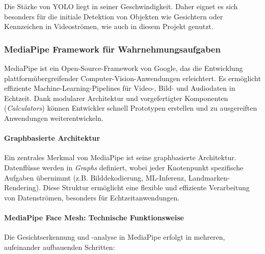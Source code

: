 Die Stärke von YOLO liegt in seiner Geschwindigkeit. Daher eignet es sich besonders für die initiale Detektion von Objekten wie Gesichtern oder Kennzeichen in Videoströmen, wie auch in diesem Projekt genutzt.

\subsubsection{MediaPipe Framework für Wahrnehmungsaufgaben}

MediaPipe ist ein Open-Source-Framework von Google, das die Entwicklung plattformübergreifender Computer-Vision-Anwendungen erleichtert. Es ermöglicht effiziente Machine-Learning-Pipelines für Video-, Bild- und Audiodaten in Echtzeit. Dank modularer Architektur und vorgefertigter Komponenten (\textit{Calculators}) können Entwickler schnell Prototypen erstellen und zu ausgereiften Anwendungen weiterentwickeln.

\paragraph{Graphbasierte Architektur}
Ein zentrales Merkmal von MediaPipe ist seine graphbasierte Architektur. Datenflüsse werden in \textit{Graphs} definiert, wobei jeder Knotenpunkt spezifische Aufgaben übernimmt (z.B. Bilddekodierung, ML-Inferenz, Landmarken-Rendering). Diese Struktur ermöglicht eine flexible und effiziente Verarbeitung von Datenströmen, besonders für Echtzeitanwendungen.

\paragraph{MediaPipe Face Mesh: Technische Funktionsweise}
Die Gesichtserkennung und -analyse in MediaPipe erfolgt in mehreren, aufeinander aufbauenden Schritten:

